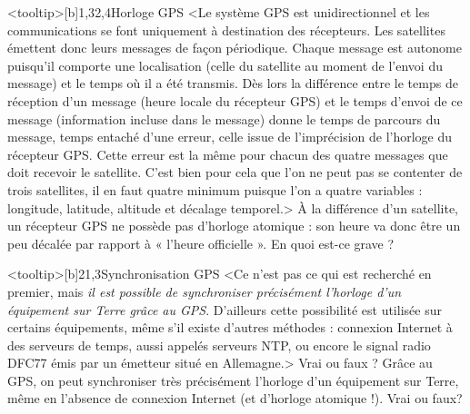 \begin{quiz}[title={Localisation, cartographie et mobilité}]
\vspace{-\baselineskip}
\begin{quizquestion}<tooltip>[b]{1,3}{2,4}{Horloge GPS}
<Le système GPS est unidirectionnel et les communications se font uniquement à destination des récepteurs. Les satellites émettent donc leurs messages de façon périodique.
Chaque message est autonome puisqu’il comporte une localisation (celle du satellite au moment de l’envoi du message) et le temps où il a été transmis.
Dès lors la différence entre le temps de réception d’un message (heure locale du récepteur GPS) et le temps d’envoi de ce message (information incluse dans le message) donne le temps de parcours du message, temps entaché d’une erreur, celle issue de l’imprécision de l’horloge du récepteur GPS.
Cette erreur est la même pour chacun des quatre messages que doit recevoir le satellite.
C’est bien pour cela que l’on ne peut pas se contenter de trois satellites, il en faut quatre minimum puisque l’on a quatre variables : longitude, latitude, altitude et décalage temporel.>
À la différence d’un satellite, un récepteur GPS ne possède pas d’horloge atomique : son heure va donc être un peu décalée par rapport à « l'heure officielle ». En quoi est-ce grave ?
\end{quizquestion}

\begin{quizquestion*}<tooltip>[b]{2}{1,3}{Synchronisation GPS}
<Ce n’est pas ce qui est recherché en premier, mais \emph{il est possible de synchroniser précisément l'horloge d'un équipement sur Terre grâce au GPS}. D’ailleurs cette possibilité est utilisée sur certains équipements, même s’il existe d’autres méthodes : connexion Internet à des serveurs de temps, aussi appelés serveurs NTP, ou encore le signal radio DFC77 émis par un émetteur situé en Allemagne.>
Vrai ou faux ? Grâce au GPS, on peut synchroniser très précisément l’horloge d'un équipement sur Terre, même en l’absence de connexion Internet (et d’horloge atomique !).
Vrai ou faux? 
\end{quizquestion*}


\end{quiz}
